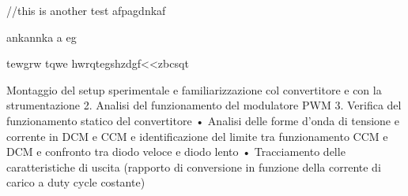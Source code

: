     //this is another test
    afpagdnkaf

    ankannka
    a
    eg

    tewgrw
    tqwe
    hwrqtegshzdgf<<zbcsqt
    


    Montaggio del setup sperimentale e familiarizzazione col convertitore e con la
    strumentazione
    2. Analisi del funzionamento del modulatore PWM
    3. Verifica del funzionamento statico del convertitore
    • Analisi delle forme d’onda di tensione e corrente in DCM e CCM e identificazione
    del limite tra funzionamento CCM e DCM e confronto tra diodo
    veloce e diodo lento
    • Tracciamento delle caratteristiche di uscita (rapporto di conversione in
    funzione della corrente di carico a duty cycle costante)